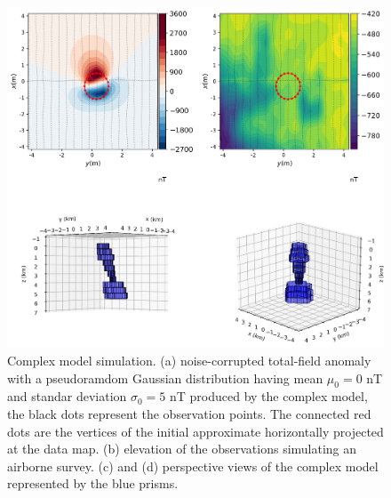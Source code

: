 \begin{figure}
    \centering
    \includegraphics[scale=.5]{figures/complex_model_data.png}
    \caption{Complex model simulation. (a) noise-corrupted total-field anomaly with a pseudoramdom Gaussian distribution having mean $\mu_0 = 0$ nT and standar deviation $\sigma_0 = 5$ nT produced by the complex model, the black dots represent the observation points. The connected red dots are the vertices of the initial approximate horizontally projected at the data map. (b) elevation of the observations simulating an airborne survey. (c) and (d) perspective views of the complex model represented by the blue prisms.
}
    \label{fig:complex_model}
\end{figure}

